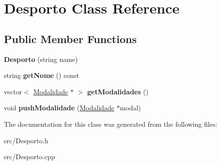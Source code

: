 \hypertarget{class_desporto}{}\section{Desporto Class Reference}
\label{class_desporto}
\subsection*{Public Member Functions}
\begin{DoxyCompactItemize}
\item 
\hypertarget{class_desporto_a5d74506380974d05a2d79c21527ffc83}{}{\bfseries Desporto} (string name)\label{class_desporto_a5d74506380974d05a2d79c21527ffc83}

\item 
\hypertarget{class_desporto_ab8a8413f056aeaa6dbd55730a7b6cd85}{}string {\bfseries get\+Nome} () const \label{class_desporto_ab8a8413f056aeaa6dbd55730a7b6cd85}

\item 
\hypertarget{class_desporto_af8436b5a0694a82b3105d2b81cea9166}{}vector$<$ \hyperlink{class_modalidade}{Modalidade} $\ast$ $>$ {\bfseries get\+Modalidades} ()\label{class_desporto_af8436b5a0694a82b3105d2b81cea9166}

\item 
\hypertarget{class_desporto_a67b1e45c5dc36c7b5d34a96b53e3fe32}{}void {\bfseries push\+Modalidade} (\hyperlink{class_modalidade}{Modalidade} $\ast$modal)\label{class_desporto_a67b1e45c5dc36c7b5d34a96b53e3fe32}

\end{DoxyCompactItemize}


The documentation for this class was generated from the following files\+:\begin{DoxyCompactItemize}
\item 
src/Desporto.\+h\item 
src/Desporto.\+cpp\end{DoxyCompactItemize}
